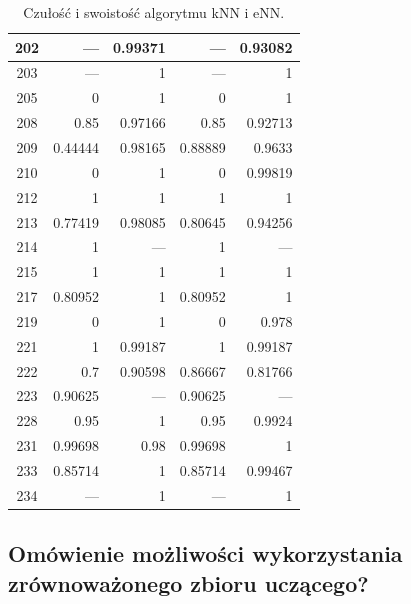 \begin{table}[H]
\begin{tabular}{|c|r|r|r|r|}
\hline                                   
202 &--- &0.99371 &--- &0.93082\\        
\hline                                   
203 &--- &1 &--- &1\\                    
\hline                                   
205 &0 &1 &0 &1\\                        
\hline                                   
208 &0.85 &0.97166 &0.85 &0.92713\\      
\hline                                   
209 &0.44444 &0.98165 &0.88889 &0.9633\\ 
\hline                                   
210 &0 &1 &0 &0.99819\\                  
\hline                                   
212 &1 &1 &1 &1\\                        
\hline                                   
213 &0.77419 &0.98085 &0.80645 &0.94256\\
\hline                                   
214 &1 &--- &1 &---\\                    
\hline                                   
215 &1 &1 &1 &1\\                        
\hline                                   
217 &0.80952 &1 &0.80952 &1\\            
\hline                                   
219 &0 &1 &0 &0.978\\                    
\hline                                   
221 &1 &0.99187 &1 &0.99187\\            
\hline                                   
222 &0.7 &0.90598 &0.86667 &0.81766\\    
\hline                                   
223 &0.90625 &--- &0.90625 &---\\        
\hline                                   
228 &0.95 &1 &0.95 &0.9924\\             
\hline                                   
231 &0.99698 &0.98 &0.99698 &1\\         
\hline                                   
233 &0.85714 &1 &0.85714 &0.99467\\      
\hline                                   
234 &--- &1 &--- &1\\                    
\hline                                   
	\end{tabular}
	\caption{Czułość i swoistość algorytmu kNN i eNN.}
	\label{tab:matlab-wskazniki}
\end{table}
\subsection{Omówienie możliwości wykorzystania zrównoważonego zbioru uczącego?}

